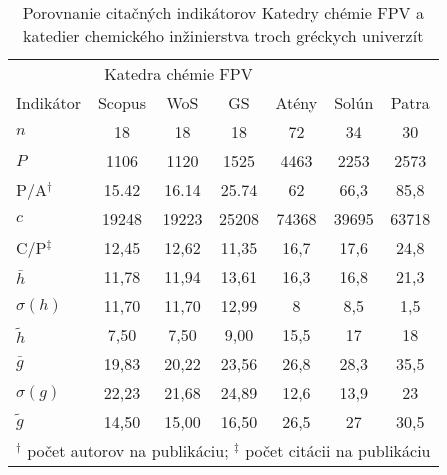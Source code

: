 \begin{SCtable}
  \centering\small
  \caption[Porovnanie KCh FPV a kat. chem. inžinierstva  troch gréckych univerzít]%
  {Porovnanie citačných indikátorov Katedry chémie FPV a katedier chemického inžinierstva troch gréckych univerzít \citep{Kazakis2015}}
  \label{tab:kazakis.results1}
  \begin{tabular}{lcccccc}
    \toprule\noalign{\vspace{.3ex}}
    & \multicolumn{3}{c}{Katedra chémie FPV} & \multicolumn{3}{c}{\citet{Kazakis2015}} \\
    \cmidrule{2-4}\cmidrule{5-7}
    Indikátor & Scopus & WoS & GS &  Atény & Solún & Patra \\[0.3ex]
    \midrule\noalign{\vspace{.5ex}}
    $n$          & 18    & 18    & 18    & 72    & 34    & 30    \\
    $P$          & 1106  & 1120  & 1525  & 4463  & 2253  & 2573  \\
    P/A$^\dagger$ & 15.42 & 16.14 & 25.74 & 62    & 66,3  & 85,8  \\
    $c$          & 19248 & 19223 & 25208 & 74368 & 39695 & 63718 \\
    C/P$^\ddagger$ & 12,45 & 12,62 & 11,35 & 16,7  & 17,6  & 24,8  \\[1ex]
    $\bar{h}$    & 11,78 & 11,94 & 13,61 & 16,3  & 16,8  & 21,3  \\
    $\sigma (h)$ & 11,70 & 11,70 & 12,99 & 8     & 8,5   & 1,5   \\
    $\tilde{h}$  & 7,50  & 7,50  & 9,00  & 15,5  & 17    & 18    \\
    $\bar{g}$    & 19,83 & 20,22 & 23,56 & 26,8  & 28,3  & 35,5  \\
    $\sigma (g)$ & 22,23 & 21,68 & 24,89 & 12,6  & 13,9  & 23    \\
    $\tilde{g}$  & 14,50 & 15,00 & 16,50 & 26,5  & 27    & 30,5  \\[0.5ex]
    \bottomrule
    \multicolumn{7}{l}{\footnotesize $^\dagger$ počet autorov na publikáciu; $^\ddagger$ počet citácii na publikáciu} \\
  \end{tabular}
\end{SCtable}


